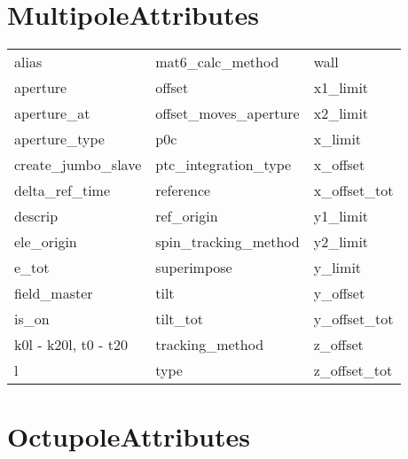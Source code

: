  \section{MultipoleAttributes}
 \label{s:list.multipole}
 
 \begin{tabular}{lll} \toprule
alias                       & mat6_calc_method            & wall                        \\
aperture                    & offset                      & x1_limit                    \\
aperture_at                 & offset_moves_aperture       & x2_limit                    \\
aperture_type               & p0c                         & x_limit                     \\
create_jumbo_slave          & ptc_integration_type        & x_offset                    \\
delta_ref_time              & reference                   & x_offset_tot                \\
descrip                     & ref_origin                  & y1_limit                    \\
ele_origin                  & spin_tracking_method        & y2_limit                    \\
e_tot                       & superimpose                 & y_limit                     \\
field_master                & tilt                        & y_offset                    \\
is_on                       & tilt_tot                    & y_offset_tot                \\
k0l - k20l, t0 - t20        & tracking_method             & z_offset                    \\
l                           & type                        & z_offset_tot                \\
 \bottomrule
 \end{tabular}
 \vfill
 
 \section{OctupoleAttributes}
 \label{s:list.octupole}
 
